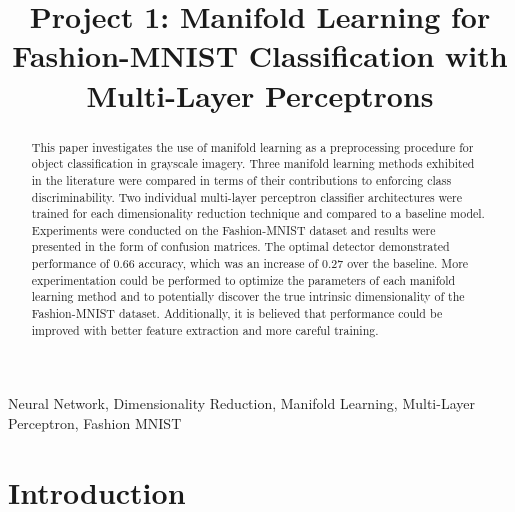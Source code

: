 \documentclass[conference]{IEEEtran}
\begin{document}
\title{Project 1: Manifold Learning for Fashion-MNIST Classification with Multi-Layer Perceptrons}
\author{

}

\maketitle


\begin{abstract}
	This paper investigates the use of manifold learning as a preprocessing procedure for object classification in grayscale imagery.  Three manifold learning methods exhibited in the literature were compared in terms of their contributions to enforcing class discriminability.  Two individual multi-layer perceptron classifier architectures were trained for each dimensionality reduction technique and compared to a baseline model. Experiments were conducted on the Fashion-MNIST dataset and results were presented in the form of confusion matrices.  The optimal detector demonstrated performance of 0.66 accuracy, which was an increase of 0.27 over the baseline.  More experimentation could be performed to optimize the parameters of each manifold learning method and to potentially discover the true intrinsic dimensionality of the Fashion-MNIST dataset.  Additionally, it is believed that performance could be improved with better feature extraction and more careful training.
\end{abstract} 

\begin{IEEEkeywords}
Neural Network, Dimensionality Reduction, Manifold Learning, Multi-Layer Perceptron, Fashion MNIST
\end{IEEEkeywords}


\section{Introduction} 
\end{document}
